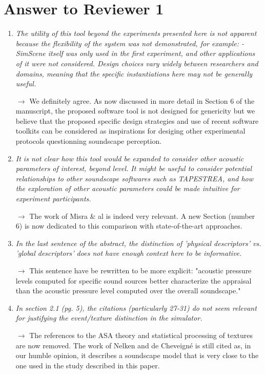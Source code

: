 \documentclass[10pt]{article}
\begin{document}
\section{Answer to Reviewer 1}

\begin{enumerate}

\item \emph{The utility of this tool beyond the experiments presented here is not apparent because the flexibility of the system was not demonstrated, for example:
- SimScene itself was only used in the first experiment, and other applications of it were not considered. Design choices vary widely between researchers and domains, meaning that the specific instantiations here may not be generally useful.}

$\rightarrow$ We definitely agree. As now discussed in more detail in Section 6 of the manuscript, the proposed software tool is not designed for genericity but we believe that the proposed specific design strategies and use of recent software toolkits can be considered as inspirations for desiging other experimental protocols questionning soundscape perception. 

\item \emph{It is not clear how this tool would be expanded to consider other acoustic parameters of interest, beyond level. It might be useful to consider potential relationships to other soundscape softwares such as TAPESTREA, and how the exploration of other acoustic parameters could be made intuitive for experiment participants.}

$\rightarrow$ The work of Misra \& al is indeed very relevant. A new Section (number 6) is now dedicated to this comparison with state-of-the-art approaches.

\item \emph{In the last sentence of the abstract, the distinction of 'physical descriptors' vs. 'global descriptors'  does not have enough context here to be informative.}

$\rightarrow$ This sentence have be rewritten to be more explicit: "acoustic pressure levels computed for specific sound sources better characterize the appraisal than the acoustic pressure level computed over the overall soundscape."

\item \emph{In section 2.1 (pg. 5), the citations (particularly 27-31) do not seem relevant for justifying the event/texture distinction in the simulator.}

$\rightarrow$ The references to the ASA theory and statistical processing of textures are now removed. The work of Nelken and de Cheveigné is still cited as, in our humble opinion, it describes a soundscape model that is very close to the one used in the study described in this paper.

\end{enumerate}
\end{document}

